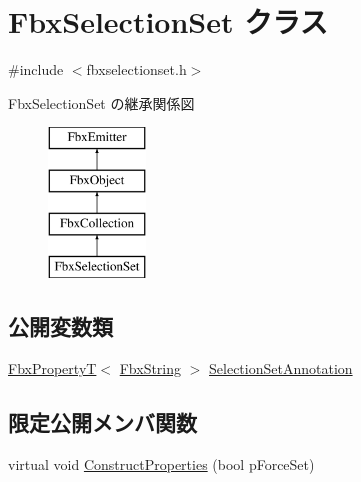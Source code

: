 \hypertarget{class_fbx_selection_set}{}\section{Fbx\+Selection\+Set クラス}
\label{class_fbx_selection_set}


{\ttfamily \#include $<$fbxselectionset.\+h$>$}

Fbx\+Selection\+Set の継承関係図\begin{figure}[H]
\begin{center}
\leavevmode
\includegraphics[height=4.000000cm]{class_fbx_selection_set}
\end{center}
\end{figure}
\subsection*{公開変数類}
\begin{DoxyCompactItemize}
\item 
\hyperlink{class_fbx_property_t}{Fbx\+PropertyT}$<$ \hyperlink{class_fbx_string}{Fbx\+String} $>$ \hyperlink{class_fbx_selection_set_abe27bd368bd6e3df129e808900a72f19}{Selection\+Set\+Annotation}
\end{DoxyCompactItemize}
\subsection*{限定公開メンバ関数}
\begin{DoxyCompactItemize}
\item 
virtual void \hyperlink{class_fbx_selection_set_adcb0af5e3ecfd0957fbf0fe6958d8d6b}{Construct\+Properties} (bool p\+Force\+Set)
\end{DoxyCompactItemize}
